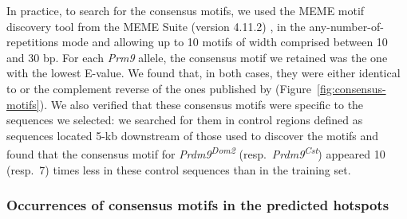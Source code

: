 In practice, to search for the consensus motifs, we used the MEME motif discovery tool \citep{bailey2006meme} from the MEME Suite (version 4.11.2) \citep{bailey2009meme}, in the any-number-of-repetitions mode and allowing up to 10 motifs of width comprised between 10 and 30 bp.
For each \textit{Prm9} allele, the consensus motif we retained was the one with the lowest E-value.
We found that, in both cases, they were either identical to or the complement reverse of the ones published by \citet{baker2015prdm9} (Figure~\ref{fig:consensus-motifs}).
We also verified that these consensus motifs were specific to the sequences we selected: 
we searched for them in control regions defined as sequences located 5-kb downstream of those used to discover the motifs and found that the consensus motif for \textit{Prdm9\textsuperscript{Dom2}} (resp.\ \textit{Prdm9\textsuperscript{Cst}}) appeared 10 (resp.\ 7) times less in these control sequences than in the training set.


\subsubsection{Occurrences of consensus motifs in the predicted hotspots}

